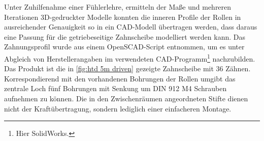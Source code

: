 		Unter Zuhilfenahme einer Fühlerlehre, ermitteln der Maße und mehreren Iterationen 3D-gedruckter Modelle konnten die inneren Profile der Rollen in ausreichender Genauigkeit so in ein CAD-Modell übertragen werden, dass daraus eine Passung für die getriebeseitige Zahnscheibe modelliert werden kann.
		Das Zahnungsprofil wurde aus einem OpenSCAD-Script\cite{thingiverse.tooth.profiles.2012} entnommen, um es unter Abgleich von Herstellerangaben\cite{gates.catalogue.2021,GatesCorporation.drive.design.manual.2014} im verwendeten CAD-Programm\footnote{Hier SolidWorks.} nachzubilden.
		Das Produkt ist die in \cref{fig:htd 5m driven} gezeigte Zahnscheibe mit 36 Zähnen.
		Korrespondierend mit den vorhandenen Bohrungen der Rollen umgibt das zentrale Loch fünf Bohrungen mit Senkung um DIN 912 M4 Schrauben aufnehmen zu können.
		Die in den Zwischenräumen angeordneten Stifte dienen nicht der Kraftübertragung, sondern lediglich einer einfacheren Montage.
		
